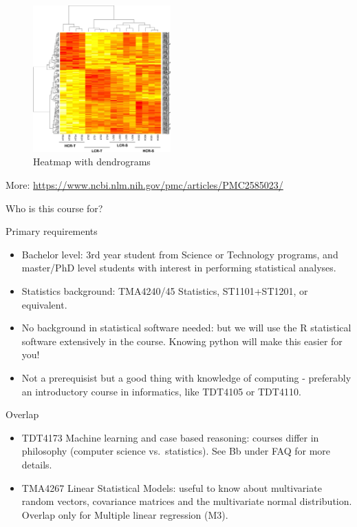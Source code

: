\documentclass[ignorenonframetext,]{beamer}
\begin{document}
\begin{frame}

\begin{figure}
\includegraphics[width=150pt]{heatmap} \caption{Heatmap with dendrograms}\label{fig:heatmap_pic}
\end{figure}

More: \url{https://www.ncbi.nlm.nih.gov/pmc/articles/PMC2585023/}

\end{frame}

\begin{frame}{Who is this course for?}

\begin{block}{Primary requirements}

\begin{itemize}
\item
  Bachelor level: 3rd year student from Science or Technology programs,
  and master/PhD level students with interest in performing statistical
  analyses.
\item
  Statistics background: TMA4240/45 Statistics, ST1101+ST1201, or
  equivalent.
\item
  No background in statistical software needed: but we will use the R
  statistical software extensively in the course. Knowing python will
  make this easier for you!
\item
  Not a prerequisist but a good thing with knowledge of computing -
  preferably an introductory course in informatics, like TDT4105 or
  TDT4110.
\end{itemize}

\end{block}

\end{frame}

\begin{frame}

\begin{block}{Overlap}

\begin{itemize}
\item
  TDT4173 Machine learning and case based reasoning: courses differ in
  philosophy (computer science vs.~statistics). See Bb under FAQ for
  more details.
\item
  TMA4267 Linear Statistical Models: useful to know about multivariate
  random vectors, covariance matrices and the multivariate normal
  distribution. Overlap only for Multiple linear regression (M3).
\end{itemize}

\end{block}

\end{frame}
\end{document}
